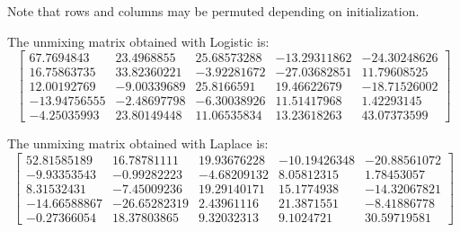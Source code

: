 \begin{answer}


Note that rows and columns may be permuted depending on initialization.


The unmixing matrix obtained with Logistic is:
$$
\begin{bmatrix}
  67.7694843 &   23.4968855  & 25.68573288 & -13.29311862 & -24.30248626 \\
 16.75863735 &   33.82360221 & -3.92281672 & -27.03682851 &  11.79608525 \\
 12.00192769 &   -9.00339689 & 25.8166591  &  19.46622679 & -18.71526002 \\
-13.94756555 &   -2.48697798 & -6.30038926 &  11.51417968 &   1.42293145 \\
 -4.25035993 &   23.80149448 & 11.06535834 &  13.23618263 &  43.07373599
\end{bmatrix}
$$



The unmixing matrix obtained with Laplace is:
$$
\begin{bmatrix}
 52.81585189 &  16.78781111 &  19.93676228 & -10.19426348 &-20.88561072 \\
 -9.93353543 & -0.99282223  &-4.68209132   & 8.05812315 &  1.78453057 \\
  8.31532431 & -7.45009236  &19.29140171  & 15.1774938 & -14.32067821 \\
-14.66588867 &-26.65282319  & 2.43961116  & 21.3871551 &  -8.41886778 \\
 -0.27366054 & 18.37803865  & 9.32032313   & 9.1024721 &   30.59719581
\end{bmatrix}
$$

\end{answer}
